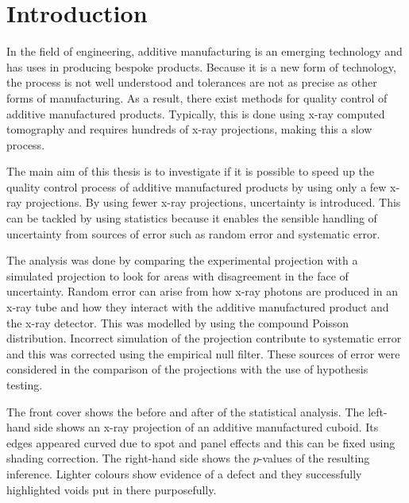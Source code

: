 \documentclass[12pt, a4paper, twoside]{memoir}
\begin{document}
\newpage

\mainmatter

\chapter{Introduction}

In the field of engineering, additive manufacturing is an emerging technology and has uses in producing bespoke products. Because it is a new form of technology, the process is not well understood and tolerances are not as precise as other forms of manufacturing. As a result, there exist methods for quality control of additive manufactured products. Typically, this is done using x-ray computed tomography and requires hundreds of x-ray projections, making this a slow process.

The main aim of this thesis is to investigate if it is possible to speed up the quality control process of additive manufactured products by using only a few x-ray projections. By using fewer x-ray projections, uncertainty is introduced. This can be tackled by using statistics because it enables the sensible handling of uncertainty from sources of error such as random error and systematic error.

The analysis was done by comparing the experimental projection with a simulated projection to look for areas with disagreement in the face of uncertainty. Random error can arise from how x-ray photons are produced in an x-ray tube and how they interact with the additive manufactured product and the x-ray detector. This was modelled by using the compound Poisson distribution. Incorrect simulation of the projection contribute to systematic error and this was corrected using the empirical null filter. These sources of error were considered in the comparison of the projections with the use of hypothesis testing.

The front cover shows the before and after of the statistical analysis. The left-hand side shows an x-ray projection of an additive manufactured cuboid. Its edges appeared curved due to spot and panel effects and this can be fixed using shading correction. The right-hand side shows the $p$-values of the resulting inference. Lighter colours show evidence of a defect and they successfully highlighted voids put in there purposefully.
\end{document}
